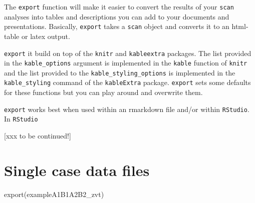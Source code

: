 \documentclass[
]{book}
\makeatletter
\newenvironment{Shaded}{\begin{snugshade}}{\end{snugshade}}
\newcommand{\FunctionTok}[1]{\textcolor[rgb]{0.00,0.00,0.00}{#1}}
\newcommand{\NormalTok}[1]{#1}
\newenvironment{kframe}{%
\medskip{}
\setlength{\fboxsep}{.8em}
 \def\at@end@of@kframe{}%
 \ifinner\ifhmode%
  \def\at@end@of@kframe{\end{minipage}}%
  \begin{minipage}{\columnwidth}%
 \fi\fi%
 \def\FrameCommand##1{\hskip\@totalleftmargin \hskip-\fboxsep
 \colorbox{shadecolor}{##1}\hskip-\fboxsep
     \hskip-\linewidth \hskip-\@totalleftmargin \hskip\columnwidth}%
 \MakeFramed {\advance\hsize-\width
   \@totalleftmargin\z@ \linewidth\hsize
   \@setminipage}}%
 {\par\unskip\endMakeFramed%
 \at@end@of@kframe}
\newenvironment{rmdblock}[1]
  {
  \begin{itemize}
  \renewcommand{\labelitemi}{
    \raisebox{-.7\height}[0pt][0pt]{
      {\setkeys{Gin}{width=3em,keepaspectratio}\texttt{[image: images/\#1]}}
    }
  }
  \setlength{\fboxsep}{1em}
  \begin{kframe}
  \item
  }
  {
  \end{kframe}
  \end{itemize}
  }
\newenvironment{rmdnote}
  {\begin{rmdblock}{bulp}}
{\end{rmdblock}}
\makeatother
\begin{document}
The \texttt{export} function will make it easier to convert the results of your \texttt{scan} analyses into tables and descriptions you can add to your documents and presentations. Basically, \texttt{export} takes a \texttt{scan} object and converts it to an html-table or latex output.

\begin{rmdnote}
\texttt{export} it build on top of the \texttt{knitr} and
\texttt{kableextra} packages. The list provided in the
\texttt{kable\_options} argument is implemented in the \texttt{kable}
function of \texttt{knitr} and the list provided to the
\texttt{kable\_styling\_options} is implemented in the
\texttt{kable\_styling} command of the \texttt{kableExtra} package.
\texttt{export} sets some defaults for these functions but you can play
around and overwrite them.
\end{rmdnote}

\texttt{export} works best when used within an rmarkdown file and/or within \texttt{RStudio}.\\
In \texttt{RStudio}

{[}xxx to be continued!{]}

\hypertarget{single-case-data-files}{%
\section{Single case data files}\label{single-case-data-files}}

\begin{Shaded}
\begin{Highlighting}[]
\FunctionTok{export}\NormalTok{(exampleA1B1A2B2\_zvt)}
\end{Highlighting}
\end{Shaded}
\end{document}
